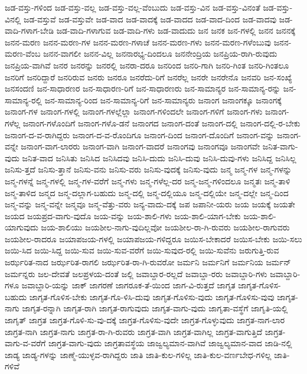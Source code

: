 {ಜಡ-ವಸ್ತು-ಗಳಿಂದ
ಜಡ-ವಸ್ತು-ವಲ್ಲ
ಜಡ-ವಸ್ತು-ವಲ್ಲ-ವೆಂಬುದು
ಜಡ-ವಸ್ತು-ವಿನ
ಜಡ-ವಸ್ತು-ವಿನಂತೆ
ಜಡ-ವಸ್ತು-ವಿನಲ್ಲಿ
ಜಡ-ವಸ್ತುವೆ
ಜಡ-ವಸ್ತುವೇ
ಜಡ-ವಾದ
ಜಡ-ವಾದಕ್ಕೆ
ಜಡ-ವಾದದ
ಜಡ-ವಾದ-ದಿಂದ
ಜಡ-ವಾದವು
ಜಡ-ವಾದಿ-ಗಳಾಗ-ಬೇಡಿ
ಜಡ-ವಾದಿ-ಗಳಾಗುವ
ಜಡ-ವಾದಿ-ಗಳು
ಜಡ-ವಾದುದು
ಜನ
ಜನಕ
ಜನ-ಗಳಲ್ಲಿ
ಜನನ
ಜನನಕ್ಕೆ
ಜನನ-ಮರಣ
ಜನನ-ಮರಣ-ಗಳ
ಜನನ-ಮರಣ-ಗಳಾಚೆ
ಜನನ-ಮರಣ-ಗಳು
ಜನನ-ಮರಣ-ಗಳೆಂಬುವು
ಜನನ-ಮರಣ-ವೆಂಬ
ಜನನ-ವಾಗಲೀ
ಜನನ-ವಿಲ್ಲ
ಜನನಾರಭ್ಯ-ದಿಂದಲೂ
ಜನನೇಂದ್ರಿಯ
ಜನಪ್ರಿಯ-ರಾಗಿ-ರುವುದು
ಜನಪ್ರಿಯ-ವಾಗಿವೆ
ಜನರ
ಜನರನ್ನು
ಜನರಲ್ಲಿ
ಜನರಾ-ದರೂ
ಜನರಿಂದ
ಜನರಿ-ಗಾಗಿ
ಜನರಿ-ಗಿಂತ
ಜನರಿ-ಗಿಂತಲೂ
ಜನರಿಗೆ
ಜನರಿದ್ದಾರೆ
ಜನರಿರುವ
ಜನರು
ಜನರೂ
ಜನರೆದು-ರಿಗೆ
ಜನರೆಲ್ಲ
ಜನರೇ
ಜನರೇನೊ
ಜನವರಿ
ಜನ-ಸಂಖ್ಯೆ
ಜನಸಂದಣಿ
ಜನ-ಸಾಧಾರಣರ
ಜನ-ಸಾಧಾರಣ-ರಿಗೆ
ಜನ-ಸಾಧಾರಣರು
ಜನ-ಸಾಮಾನ್ಯರ
ಜನ-ಸಾಮಾನ್ಯ-ರನ್ನು
ಜನ-ಸಾಮಾನ್ಯ-ರಲ್ಲಿ
ಜನ-ಸಾಮಾನ್ಯ-ರಿಂದ
ಜನ-ಸಾಮಾನ್ಯ-ರಿಗೆ
ಜನ-ಸಾಮಾನ್ಯರು
ಜನಾಂಗ
ಜನಾಂಗಕ್ಕೂ
ಜನಾಂಗಕ್ಕೆ
ಜನಾಂಗ-ಗಳ
ಜನಾಂಗ-ಗಳಲ್ಲಿ
ಜನಾಂಗ-ಗಳಲ್ಲೆಲ್ಲಾ
ಜನಾಂಗ-ಗಳಿಂದಲೇ
ಜನಾಂಗ-ಗಳಿಗೆ
ಜನಾಂಗ-ಗಳು
ಜನಾಂಗ-ಗಳೆಲ್ಲ
ಜನಾಂಗ-ಗಳೊಂದಿಗೆ
ಜನಾಂಗ-ಗಳೊ-ಡನೆ
ಜನಾಂಗದ
ಜನಾಂಗ-ದಂತೆ
ಜನಾಂಗ-ದಲ್ಲಿ
ಜನಾಂಗ-ದಲ್ಲಿ-ರ-ಬೇಕು
ಜನಾಂಗ-ದ-ವ-ರಾಗಿದ್ದರು
ಜನಾಂಗ-ದ-ವ-ರೊಂದಿಗೂ
ಜನಾಂಗ-ದಿಂದ
ಜನಾಂಗ-ದೊಂದಿಗೆ
ಜನಾಂಗ-ವನ್ನು
ಜನಾಂಗ-ವನ್ನೇ
ಜನಾಂಗ-ವಾಗ-ಲಾರರು
ಜನಾಂಗ-ವಾಗಿ
ಜನಾಂಗ-ವಾದರೆ
ಜನಾಂಗವು
ಜನಾಂಗವೂ
ಜನಾಂಗವೇ
ಜನಿತ-ವಾಗು-ವುದು
ಜನಿತ-ವಾದ
ಜನಿಸಿತು
ಜನಿಸಿದ
ಜನಿಸಿದವು
ಜನಿಸಿ-ದುದು
ಜನಿಸಿ-ದುವು
ಜನಿಸಿ-ದುವು-ಗಳು
ಜನಿಸಿದ್ದ
ಜನಿಸಿಲ್ಲ
ಜನಿಸು-ತ್ತದೆ
ಜನಿಸು-ತ್ತಾನೆ
ಜನಿಸು-ವನು
ಜನಿಸು-ವರು
ಜನಿಸು-ವುದಕ್ಕೆ
ಜನಿಸು-ವುದು
ಜನ್ಮ
ಜನ್ಮ-ಗಳ
ಜನ್ಮ-ಗಳನ್ನು
ಜನ್ಮ-ಗಳನ್ನೆ
ಜನ್ಮ-ಗಳಲ್ಲಿ
ಜನ್ಮ-ಗಳ-ವರೆಗೆ
ಜನ್ಮ-ಗಳು
ಜನ್ಮ-ಗಳೆಲ್ಲ-ದರ
ಜನ್ಮ-ಜನ್ಮ-ಗಳಿಂದಲೂ
ಜನ್ಮತಃ
ಜನ್ಮ-ತಾಳಿ
ಜನ್ಮ-ತಾಳಿದ
ಜನ್ಮದ
ಜನ್ಮ-ದಲ್ಲಾಗ-ಬಹುದು
ಜನ್ಮ-ದಲ್ಲಿ
ಜನ್ಮ-ದಲ್ಲಿಯೂ
ಜನ್ಮ-ದಲ್ಲಿಯೇ
ಜನ್ಮ-ದಲ್ಲೇ
ಜನ್ಮ-ದಿಂದ
ಜನ್ಮ-ವನ್ನು
ಜನ್ಮ-ವನ್ನೇ
ಜನ್ಮವೂ
ಜನ್ಮ-ವೆತ್ತು-ವರು
ಜನ್ಯ-ವಾದು-ದಕ್ಕೆ
ಜಪ
ಜಪಾನೀ-ಯರು
ಜಯ
ಜಯಕ್ಕೆ
ಜಯತೇ
ಜಯದ
ಜಯಪ್ರದ-ವಾಗು-ವುದೊ
ಜಯ-ವನ್ನು
ಜಯ-ಶಾಲಿ-ಗಳು
ಜಯ-ಶಾಲಿ-ಯಾಗ-ಬೇಕು
ಜಯ-ಶಾಲಿ-ಯಾಗುವುದು
ಜಯ-ಶಾಲಿಯು
ಜಯಶೀಲ-ನಾಗು-ವುದಿಲ್ಲವೋ
ಜಯಶೀಲ-ರಾ-ಗಿ-ರುವರು
ಜಯಶೀಲ-ರಾಗುವರು
ಜಯಶೀಲ-ರಾದರೂ
ಜಯಾಪಜಯ-ಗಳಲ್ಲಿ
ಜಯಾಪಜಯ-ಗಳಿದ್ದರೂ
ಜಯಿಸ-ಬೇಕಾದರೆ
ಜಯಿಸ-ಬೇಕು
ಜಯಿ-ಸಲು
ಜಯಿ-ಸಿದ
ಜಯಿ-ಸಿದ್ದ
ಜಯಿ-ಸುವ
ಜಯಿ-ಸುವ-ವರೆಗೆ
ಜಯಿ-ಸುವುದ-ರಲ್ಲಿ
ಜಯಿ-ಸುವೆನು
ಜರುಗುತ್ತಿ-ರುವ
ಜರ್ಝರಿತ-ನಾದ
ಜರ್ಝರಿತ-ರಾಗಲಿ
ಜರ್ಝರಿತ-ರಾ-ಗಿ-ರುವರೋ
ಜರ್ಮನಿ
ಜರ್ಮನಿಗೆ
ಜರ್ಮನಿಯ
ಜರ್ಮನ್
ಜರ್ಮನ್ನರು
ಜಲ-ದೇವತೆ
ಜಲಪ್ರಳಯ-ದಂತೆ
ಜಲ್ಲಿ
ಜವಾಬ್ದಾರ-ರಲ್ಲದೆ
ಜವಾಬ್ದಾ-ರರು
ಜವಾಬ್ದಾರಿ-ಗಳು
ಜವಾಬ್ದಾರಿ-ಗಳೂ
ಜವಾಬ್ದಾರಿ-ಯನ್ನು
ಜಾಕ್
ಜಾಗರಣೆ
ಜಾಗರೂಕ-ತೆ-ಯಿಂದ
ಜಾಗ-ವಿ-ರುತ್ತದೆ
ಜಾಗೃತ
ಜಾಗೃತ-ಗೊಳಿಸ-ಬಹುದು
ಜಾಗೃತ-ಗೊಳಿಸ-ಬೇಕು
ಜಾಗೃತ-ಗೊ-ಳಿಸಿ-ದುವು
ಜಾಗೃತ-ಗೊಳಿಸು-ವುದು
ಜಾಗೃತ-ಗೊಳಿಸು-ವುವು
ಜಾಗೃತ-ನಾಗು
ಜಾಗೃತ-ರನ್ನಾಗಿ
ಜಾಗೃತ-ರಾಗಿ
ಜಾಗೃತ-ರಾಗುವುದು
ಜಾಗೃತ-ವಾಗು-ವುದು
ಜಾಗೃತಾ-ವಸ್ಥೆಗೆ
ಜಾಗೃತಿ-ಯಲ್ಲಿ
ಜಾಗೃತ್
ಜಾಗ್ರತ
ಜಾಗ್ರತ-ಗೊಳಿ-ಸು-ವು-ದಕ್ಕೆ
ಜಾಗ್ರತ-ಗೊಳಿಸು-ವುದೇ
ಜಾಗ್ರತ-ಗೊಳ್ಳುವುದು
ಜಾಗ್ರತ-ನಾಗ-ಲಾರ
ಜಾಗ್ರತ-ನಾಗಿ
ಜಾಗ್ರತ-ನಾಗು
ಜಾಗ್ರತ-ರಾ-ಗಿ-ರುವರು
ಜಾಗ್ರತ-ವಾಗಿ
ಜಾಗ್ರತ-ವಾಗಿಲ್ಲ
ಜಾಗ್ರತ-ವಾಗುತ್ತಿದೆ
ಜಾಗ್ರತ-ವಾಗು-ವ-ವರೆಗೆ
ಜಾಗ್ರತ-ವಾಗು-ವುದು
ಜಾಗ್ರತಾವಸ್ಥೆಯ
ಜಾಜ್ವಲ್ಯಮಾನ-ವಾಗಿವೆ
ಜಾಜ್ವಲ್ಯಮಾನ-ವಾದ
ಜಾಡಿ-ನಲ್ಲಿ
ಜಾಡ್ಯ
ಜಾಡ್ಯ-ಗಳನ್ನು
ಜಾಣ್ಮೆ-ಯುಳ್ಳವ-ರಾಗಿದ್ದರು
ಜಾತಿ
ಜಾತಿ-ಕುಲ-ಗಳಿಲ್ಲ
ಜಾತಿ-ಕುಲ-ವರ್ಣಬೇಧ-ಗಳಿಲ್ಲ
ಜಾತಿ-ಗಳಿವೆ
}
